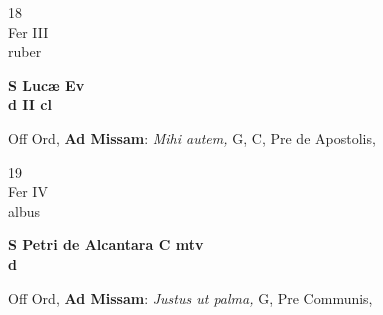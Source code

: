 \documentclass[10pt, openany]{book}
\begin{document}
        \begin{center}
            \begin{minipage}{3.5in}
                \vspace{2em}
                \begin{minipage}{0.5in}
                    {\Huge 18} \\
                    {\normalsize Fer III} \\
                    {\normalsize ruber}
                \end{minipage}
                \begin{minipage}{3.0in}
                    \textbf{ \large S Lucæ Ev \\
                    \textnormal{\normalsize d II cl}} \\ 
                \end{minipage}
                \begin{justify}Off Ord, \textbf{Ad Missam}: \textit{Mihi autem,} G, C, Pre de Apostolis,  
                \end{justify}
            \end{minipage}
        \end{center}
    
        \begin{center}
            \begin{minipage}{3.5in}
                \vspace{2em}
                \begin{minipage}{0.5in}
                    {\Huge 19} \\
                    {\normalsize Fer IV} \\
                    {\normalsize albus}
                \end{minipage}
                \begin{minipage}{3.0in}
                    \textbf{ \large S Petri de Alcantara C mtv \\
                    \textnormal{\normalsize d}} \\ 
                \end{minipage}
                \begin{justify}Off Ord, \textbf{Ad Missam}: \textit{Justus ut palma,} G, Pre Communis,  
                \end{justify}
            \end{minipage}
        \end{center}
    
\end{document}

